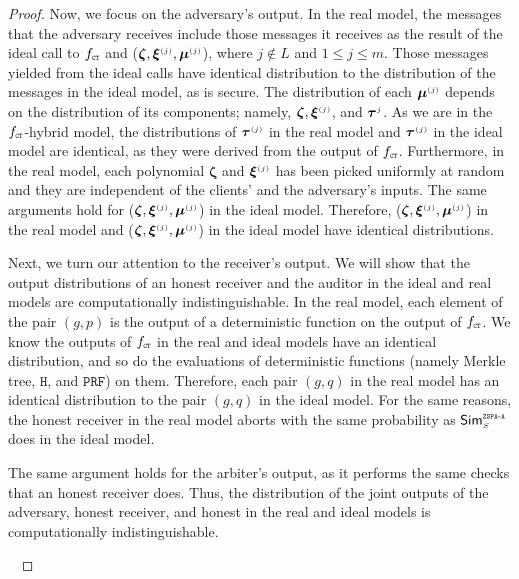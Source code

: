 \begin{proof}
 Now, we focus on the adversary’s output. In the real model, the messages that the adversary receives include those messages it receives as the result of the ideal call to $f_{\scriptscriptstyle \mathtt{CT}}$ and (${\bm \zeta}, {\bm\xi}^{\scriptscriptstyle (j)}, \bm\mu^{\scriptscriptstyle (j)}$), where $j \notin L$ and $1\leq j\leq m$. Those messages yielded from the ideal calls have identical distribution to the distribution of the messages in the ideal model, as \ct is secure. The distribution of each $\bm\mu^{\scriptscriptstyle (j)}$ depends on the distribution of its components; namely, ${\bm \zeta}, {\bm\xi}^{\scriptscriptstyle (j)}$, and $\bm \tau^{\scriptscriptstyle j}$. As we are in the $f_{\scriptscriptstyle \mathtt{CT}}$-hybrid model, the distributions of $\bm \tau^{\scriptscriptstyle (j)}$ in the real model and ${\bm \tau}^{\scriptscriptstyle (j)}$ in the ideal model are identical, as they were derived from the output of $f_{\scriptscriptstyle \mathtt{CT}}$. Furthermore, in the real model, each polynomial  ${\bm \zeta}$ and ${\bm\xi}^{\scriptscriptstyle (j)}$ has been picked uniformly at random and they are independent of the clients' and the adversary's inputs. The same arguments hold for  ($ {\bm \zeta}, {\bm\xi}^{\scriptscriptstyle (j)}, {\bm\mu}^{\scriptscriptstyle (j)}$) in the ideal model. Therefore, (${\bm \zeta}, {\bm\xi}^{\scriptscriptstyle (j)}, {\bm\mu}^{\scriptscriptstyle (j)}$) in the real model and ($ {\bm \zeta}, {\bm\xi}^{\scriptscriptstyle (j)}, {\bm\mu}^{\scriptscriptstyle (j)}$) in the ideal model have identical distributions. 
 
 
 
 
 Next, we turn our attention to the receiver’s output. We will show that the output distributions of an honest receiver and the auditor in the ideal and real models are computationally indistinguishable. In the real model,  each element of the pair $(g, p)$ is the output of a deterministic function on the output of $f_{\scriptscriptstyle \mathtt{CT}}$. We know the outputs of $f_{\scriptscriptstyle \mathtt{CT}}$ in the real and ideal models have an identical distribution, and so do the evaluations of deterministic functions (namely Merkle tree, $\mathtt{H}$, and $\mathtt{PRF}$) on them. Therefore, each pair $(g,q)$ in the real model has an identical distribution to the pair $( g, q)$ in the ideal model.  For the same reasons, the honest receiver in the real model aborts with the same probability as  $\mathsf{Sim}^{\scriptscriptstyle \mathtt{ZSPA\text{-}A}}_{\scriptscriptstyle S}$ does in the ideal model.  
 
 The same argument holds for the arbiter's output, as it performs the same checks that an honest receiver does.  Thus, the distribution of the joint outputs of the adversary, honest receiver, and honest in the real and ideal models is computationally indistinguishable. 

\


\end{proof}
